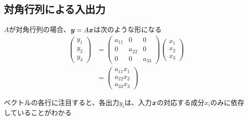 \documentclass[../../../topic_linear-algebra]{subfiles}
\begin{document}
\subsection{対角行列による入出力}

$A$が対角行列の場合、$\vb*{y} = A \vb*{x}$は次のような形になる
\begin{align*}
  \begin{pmatrix}
    y_1 \\
    y_2 \\
    y_3
  \end{pmatrix} & = \begin{pmatrix}
                      a_{11} & 0      & 0      \\
                      0      & a_{22} & 0      \\
                      0      & 0      & a_{33}
                    \end{pmatrix}
  \begin{pmatrix}
    x_1 \\
    x_2 \\
    x_3
  \end{pmatrix}                             \\
                  & = \begin{pmatrix}
                        a_{11}x_1 \\
                        a_{22}x_2 \\
                        a_{33}x_3
                      \end{pmatrix}
\end{align*}

ベクトルの各行に注目すると、各出力$y_i$は、入力$\vb*{x}$の対応する成分$x_i$のみに依存していることがわかる

\br
\end{document}
